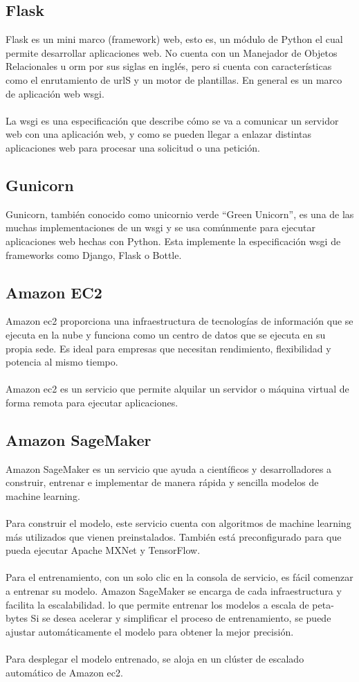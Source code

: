 \documentclass[12pt, a4paper, titlepage]{article}
\begin{document}
	\subsection{Flask}
	Flask es un mini marco (framework) web, esto es, un módulo de Python el cual permite desarrollar aplicaciones web. No cuenta con un Manejador de Objetos Relacionales u \acrshort{orm} por sus siglas en inglés, pero si cuenta con características como el enrutamiento de \acrshort{url}S y un motor de plantillas. En general es un marco de aplicación web \acrshort{wsgi}.\\\\
	La \acrfull{wsgi} es una especificación que describe cómo se va a comunicar un servidor web con una aplicación web, y como se pueden llegar a enlazar distintas aplicaciones web para procesar una solicitud o una petición.
	\subsection{Gunicorn}
	Gunicorn, también conocido como unicornio verde “Green Unicorn”, es una de las muchas implementaciones de un \acrfull{wsgi} y se usa comúnmente para ejecutar aplicaciones web hechas con Python. Esta implemente la especificación \acrshort{wsgi} de frameworks como Django, Flask o Bottle.
	\subsection{Amazon EC2}	
	Amazon \acrfull{ec2} \cite{amazon_ec2} proporciona una infraestructura de tecnologías de información que se ejecuta en la nube y funciona como un centro de datos que se ejecuta en su propia sede. Es ideal para empresas que necesitan rendimiento, flexibilidad y potencia al mismo tiempo.\\\\
	Amazon \acrshort{ec2} es un servicio que permite alquilar un servidor o máquina virtual de forma remota para ejecutar aplicaciones.	
	\subsection{Amazon SageMaker}
	Amazon SageMaker \cite{amazon_sagemaker} es un servicio que ayuda a científicos y desarrolladores a construir, entrenar e implementar de manera rápida y sencilla modelos de machine learning.\\\\
	Para construir el modelo, este servicio cuenta con algoritmos de machine learning más utilizados que vienen preinstalados. También está preconfigurado para que pueda ejecutar Apache MXNet y TensorFlow.\\\\
	Para el entrenamiento, con un solo clic en la consola de servicio, es fácil comenzar a entrenar su modelo. Amazon SageMaker se encarga de cada infraestructura y facilita la escalabilidad. lo que permite entrenar los modelos a escala de peta-bytes Si se desea acelerar y simplificar el proceso de entrenamiento, se puede ajustar automáticamente el modelo para obtener la mejor precisión.\\\\
	Para desplegar el modelo entrenado, se aloja en un clúster de escalado automático de Amazon \acrshort{ec2}.	
\end{document}
